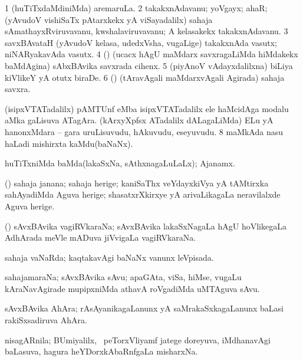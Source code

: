 \bentry
{}
\gl{\nA}
\bmng
\bnum
\num{1} (huTiTxdaMdiniMda) aremaruLa. 
\num{2} takakxnAdavanu; yoVgayx; ahaR; (yAvudoV vishiSaTx pAtarxkekx yA viSayadalilx) sahaja sAmathayxRviruvavanu, kwshalaviruvavanu;  A kelasakekx takakxnAdavanu. 
\num{3} savxBAvataH (yAvudoV kelasa, udedxVsha, \mo vugaLige) takakxnAda vasutx; niNARyakavAda vasutx. 
\num{4} (\saM) (ucacx hAgU maMdarx savxragaLiMda hiMdakekx baMdAgina) sAbxBAvika savxrada cihenx. 
\num{5} (piyAnoV vAdayxdalilxna) biLiya kiVlikeY yA otutx biraDe. 
\num{6} (\saM) (tAravAgali maMdarxvAgali Agirada) sahaja savxra. 
 (isipxVTATadalilx) 
\banum
{} pAMTUnf  eMba isipxVTATadalilx ele haMcidAga modalu  aMka gaLisuva ATagAra. 
 (kArxyXpfsx ATadalilx dALagaLiMda) ELu yA hanonxMdara -- gara uruLisuvudu, hAkuvudu, eseyuvudu. 
\eanum
\numie
\num{8} maMkAda nasu haLadi mishirxta kaMdu(baNaNx). 
\enum
\emng
\eentry

\bentry
{}
\gl{\gu}
\bmng
huTiTxniMda baMda(lakaSxNa, sAthxnagaLuLaLx); Ajanamx. 
\emng
\eentry

\bentry
{}
\gl{\nA}
\bmng
(\veYshA) sahaja janana; sahaja herige; kaniSaThx veYdayxkiVya yA tAMtirxka sahAyadiMda Aguva herige; shasatxrXkirxye yA arivaLikagaLa neravilalxde Aguva herige. 
\emng
\eentry

\bentry
{}
\gl{\nA}
\bmng
(\jiVvi) sAvxBAvika vagiRVkaraNa; sAvxBAvika lakaSxNagaLa hAgU hoVlikegaLa AdhArada meVle mADuva jiVvigaLa vagiRVkaraNa. 
\emng
\eentry

\bentry
{}
\gl{\gu}
\bmng
sahaja vaNaRda; kaqtakavAgi baNaNx \mo vanunx leVpisada. 
\emng
\eentry

\bentry
{}
\gl{\nA}
\bmng
sahajamaraNa; sAvxBAvika sAvu; apaGAta, viSa, hiMse, \mo vugaLu kAraNavAgirade mupipxniMda athavA roVgadiMda uMTAguva sAvu. 
\emng
\eentry

\bentry
{}
\gl{\nA}
\bmng
sAvxBAvika AhAra; rAsAyanikagaLanunx yA saMrakaSxkagaLanunx baLasi rakiSxsadiruva AhAra. 
\emng
\eentry

\bentry
{}
\gl{\nA}
\bmng
nisagARnila; BUmiyalilx, \sA\ peTorxVliyamf jatege doreyuva, iMdhanavAgi baLasuva, hagura heYDorxkAbaRnfgaLa misharxNa. 
\emng
\eentry

